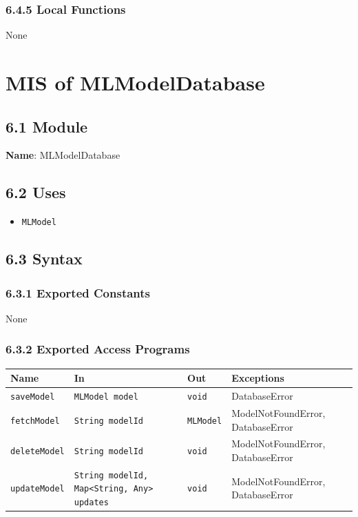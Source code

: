 \documentclass[12pt, titlepage]{article}
\begin{document}
\subsubsection{6.4.5 Local Functions}
None

\newpage


\section{MIS of MLModelDatabase}
\label{sec:MLModelDatabase}

\subsection{6.1 Module}
\textbf{Name}: MLModelDatabase

\subsection{6.2 Uses}
\begin{itemize}
    \item \texttt{MLModel}
\end{itemize}

\subsection{6.3 Syntax}

\subsubsection{6.3.1 Exported Constants}
None

\subsubsection{6.3.2 Exported Access Programs}
\begin{center}
\begin{tabular}{p{3.5cm} p{4.5cm} p{4cm} p{3cm}}
\hline
\textbf{Name} & \textbf{In} & \textbf{Out} & \textbf{Exceptions} \\
\hline
\texttt{saveModel} & \texttt{MLModel model} & \texttt{void} & DatabaseError \\
\hline
\texttt{fetchModel} & \texttt{String modelId} & \texttt{MLModel} & ModelNotFoundError, DatabaseError \\
\hline
\texttt{deleteModel} & \texttt{String modelId} & \texttt{void} & ModelNotFoundError, DatabaseError \\
\hline
\texttt{updateModel} & \texttt{String modelId, Map<String, Any> updates} & \texttt{void} & ModelNotFoundError, DatabaseError \\
\hline
\end{tabular}
\end{center}
\end{document}

